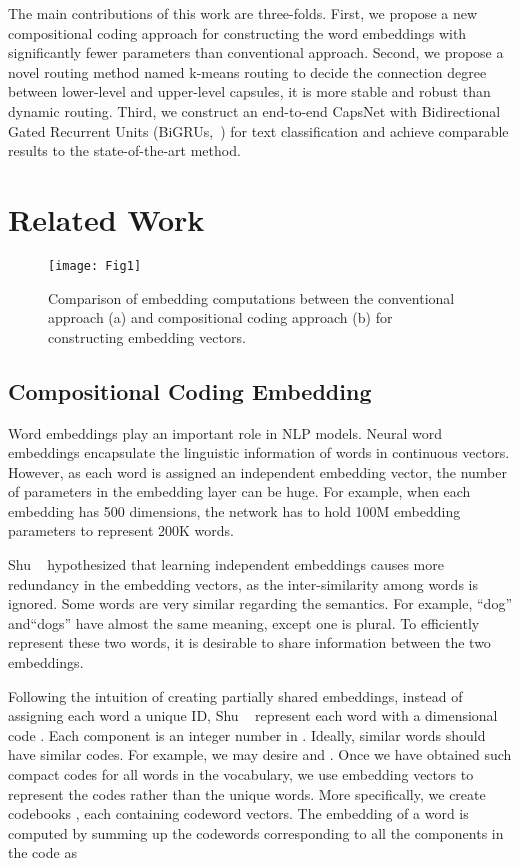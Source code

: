 \documentclass[times,twocolumn,final]{elsarticle}
\begin{document}
The main contributions of this work are three-folds. First, we propose a new compositional coding approach for constructing the word embeddings with significantly fewer parameters than conventional approach. Second, we propose a novel routing method named k-means routing to decide the connection degree between lower-level and upper-level capsules, it is more stable and robust than dynamic routing. Third, we construct an end-to-end CapsNet with Bidirectional Gated Recurrent Units (BiGRUs,~\cite{schuster1997bidirectional, cho2014properties}) for text classification and achieve comparable results to the state-of-the-art method.

\section{Related Work}

\begin{figure}
  \centering
  \texttt{[image: Fig1]}
  \caption{Comparison of embedding computations between the conventional approach (a) and compositional coding approach (b) for constructing embedding vectors.}
  \label{embedding_coding}
\end{figure}

\subsection{Compositional Coding Embedding}

Word embeddings play an important role in NLP models. Neural word embeddings encapsulate the linguistic information of words in continuous vectors. However, as each word is assigned an independent embedding vector, the number of parameters in the embedding layer can be huge. For example, when each embedding has 500 dimensions, the network has to hold 100M embedding parameters to represent 200K words.

Shu \etal~\cite{shu2018compressing} hypothesized that learning independent embeddings causes more redundancy in the embedding vectors, as the inter-similarity among words is ignored. Some words are very similar regarding the semantics. For example, ``dog'' and``dogs'' have almost the same meaning, except one is plural. To efficiently represent these two words, it is desirable to share information between the two embeddings.

Following the intuition of creating partially shared embeddings, instead of assigning each word a unique ID, Shu \etal~\cite{shu2018compressing} represent each word  with a  dimensional code . Each component  is an integer number in . Ideally, similar words should have similar codes. For example, we may desire  and . Once we have obtained such compact codes for all words in the vocabulary, we use embedding vectors to represent the codes rather than the unique words. More specifically, we create  codebooks , each containing  codeword vectors. The embedding of a word is computed by summing up the codewords corresponding to all the components in the code as
    
\end{document}

